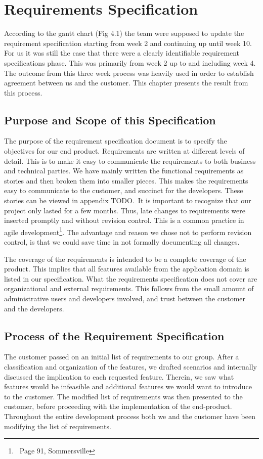 \chapter{Requirements Specification}
According to the gantt chart (Fig 4.1) the team were supposed to update the
requirement specification starting from week 2 and continuing up until week
10. For us it was still the case that there were a clearly identifiable
requirement specifications phase. This was primarily from week 2 up to and
including week 4. The outcome from this three week process was heavily used in
order to establish agreement between us and the customer. This chapter
presents the result from this process. 

\section{Purpose and Scope of this Specification}
The purpose of the requirement specification document is to specify the
objectives for our end product. Requirements are written at different
levels of detail. This is to make it easy to communicate the requirements to
both business and technical parties. We have mainly written the functional
requirements as stories and then broken them into smaller pieces. This makes
the requirements easy to communicate to the customer, and succinct for the
developers. These stories can be viewed in appendix TODO.\ It is important to
recognize that our project only lasted for a few months. Thus, late changes
to requirements were inserted promptly and without revision control. This is
a common practice in agile development\footnote{\ Page 91, Sommersville}.
The advantage and reason we chose not to perform revision control, is that we
could save time in not formally documenting all changes.

The coverage of the requirements is intended to be a complete coverage
of the product. This implies that all features available from the
application domain is listed in our specification. What the requirements
specification does not cover are organizational and external requirements. This
follows from the small amount of administrative users and developers involved,
and trust between the customer and the developers.

\section{Process of the Requirement Specification}
The customer passed on an initial list of requirements to our group. After a
classification and organization of the features, we drafted scenarios and
internally discussed the implication to each requested feature. Therein, we saw
what features would be infeasible and additional features we would want to
introduce to the customer. The modified list of requirements was then presented
to the customer, before proceeding with the implementation of the end-product.
Throughout the entire development process both we and the customer have been
modifying the list of requirements.

